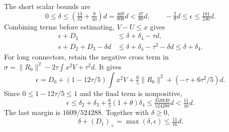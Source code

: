 The short scalar bounds are
\begin{equation}\tag{R31.8.6}\label{eq:oc:R31:8.6}
 0\le\delta\le\left(\tfrac{13}{32}+\tfrac9{50}\right)d
 =\tfrac{469}{800}d<\tfrac{47}{80}d,\qquad
 -\tfrac29d\le\epsilon\le\tfrac{181}{240}d.
\end{equation}
Combining terms before estimating, \(V-U\le x\) gives
\begin{equation}\tag{R31.8.7}\label{eq:oc:R31:8.7}
 \begin{aligned}
 \epsilon+D_2&\le\delta+\delta_4-\tau d,\\
 \epsilon+D_2+D_3-\delta d
 &\le\delta+\delta_4-\tau^2-\delta d\le\delta+\delta_4.
 \end{aligned}
\end{equation}
For long connectors, retain the negative cross term in
\(\sigma=\|R_0\|^2-2\tau\int x^2V+\tau^2d\). It gives
\[
 \epsilon=D_0+(1-12\tau/5)\int x^2V
              +\tfrac65\|R_0\|^2+(-\tau+6\tau^2/5)d.
\]
Since \(0\le1-12\tau/5\le1\) and the final term is nonpositive,
\begin{equation}\tag{R31.8.8}\label{eq:oc:R31:8.8}
 \epsilon\le\delta_2+\delta_3+\tfrac65(1+\theta)\delta_4
 \le\tfrac{358839}{524288}d<\tfrac{11}{16}d.
\end{equation}
The last margin is \(1609/524288\). Together with \(\delta\ge0\),
\begin{equation}\tag{R31.8.9}\label{eq:oc:R31:8.9}
 \delta+(D_1)_+=\max(\delta,\epsilon)\le\tfrac{11}{16}d.
\end{equation}

